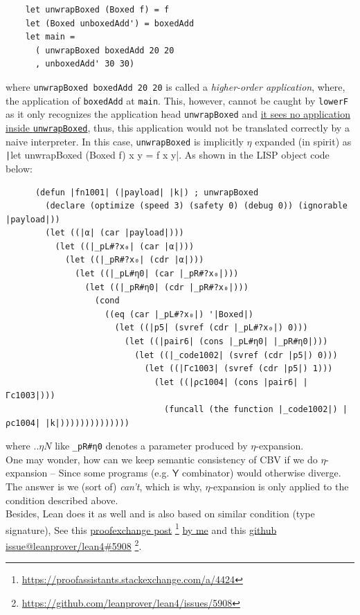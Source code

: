 \documentclass[a4paper, 11pt]{article}
\theoremstyle{remark}\newtheorem*{remark}{Remark}
\theoremstyle{definition}\newtheorem*{definition}{Definition}
\begin{document}
\begin{enumerate}
\begin{verbatim}
    let unwrapBoxed (Boxed f) = f
    let (Boxed unboxedAdd') = boxedAdd
    let main =
      ( unwrapBoxed boxedAdd 20 20
      , unboxedAdd' 30 30)
  \end{verbatim}
  where \texttt{unwrapBoxed boxedAdd 20 20} is called a \textit{higher-order application}, where,
  the application of \texttt{boxedAdd} at \texttt{main}. This, however, cannot be caught by \texttt{lowerF} as it only recognizes the application head \texttt{unwrapBoxed}
  and \underline{it sees no application inside \texttt{unwrapBoxed}},
  thus, this application would not be translated correctly by a naive interpreter.
  In this case, \texttt{unwrapBoxed} is implicitly $\eta$ expanded
  (in spirit) as \texttt|let unwrapBoxed (Boxed f) x y = f x y|.
  As shown in the LISP object code below:
    \begin{verbatim}
      (defun |fn1001| (|payload| |k|) ; unwrapBoxed
        (declare (optimize (speed 3) (safety 0) (debug 0)) (ignorable |payload|))
        (let ((|α| (car |payload|)))
          (let ((|_pL#?x₀| (car |α|)))
            (let ((|_pR#?x₀| (cdr |α|)))
              (let ((|_pL#η0| (car |_pR#?x₀|)))
                (let ((|_pR#η0| (cdr |_pR#?x₀|)))
                  (cond
                    ((eq (car |_pL#?x₀|) '|Boxed|)
                      (let ((|p5| (svref (cdr |_pL#?x₀|) 0)))
                        (let ((|pair6| (cons |_pL#η0| |_pR#η0|)))
                          (let ((|_code1002| (svref (cdr |p5|) 0)))
                            (let ((|Γc1003| (svref (cdr |p5|) 1)))
                              (let ((|ρc1004| (cons |pair6| |Γc1003|)))
                                (funcall (the function |_code1002|) |ρc1004| |k|))))))))))))))
    \end{verbatim}
  where $..\eta N$ like \texttt{\_pR\#η0} denotes a parameter produced by $\eta$-expansion. \\
  One may wonder, how can we keep semantic consistency of CBV if we do $\eta$-expansion -- Since
  some programs (e.g. $\mathsf{Y}$ combinator) would otherwise diverge. The answer is we (sort of)
  \textit{can't}, which is why, $\eta$-expansion is only applied to the condition described above.\\
  Besides, Lean does it as well and is also based on similar condition (type signature), See
  this \href{https://proofassistants.stackexchange.com/a/4424}{proofexchange post} \footnote{
  \url{https://proofassistants.stackexchange.com/a/4424}}
  \underline{by me} and this \href{https://github.com/leanprover/lean4/issues/5908}{github issue@leanprover/lean4\#5908} \footnote{
  \url{https://github.com/leanprover/lean4/issues/5908}}.


\end{enumerate}
\end{document}

